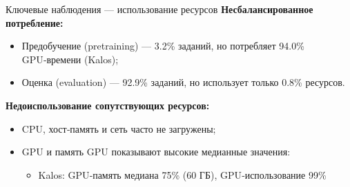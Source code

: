 \begin{frame}{Ключевые наблюдения — использование ресурсов}
	\textbf{Несбалансированное потребление:}
	\begin{itemize}
		\item Предобучение (pretraining) — 3.2\% заданий, но потребляет 94.0\% GPU‑времени (Kalos);
		\item Оценка (evaluation) — 92.9\% заданий, но использует только 0.8\% ресурсов.
	\end{itemize}
	
	\textbf{Недоиспользование сопутствующих ресурсов:}
	\begin{itemize}
		\item CPU, хост‑память и сеть часто не загружены;
		\item GPU и память GPU показывают высокие медианные значения:
		\begin{itemize}
			\item Kalos: GPU‑память медиана 75\% (60 ГБ), GPU‑использование 99\%
		\end{itemize}
	\end{itemize}
\end{frame}